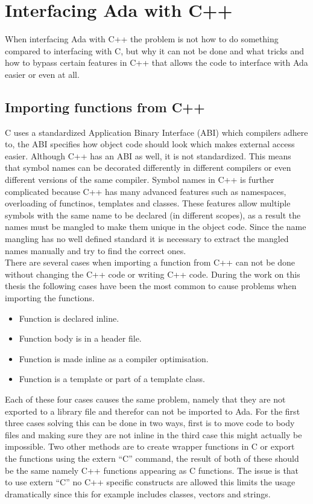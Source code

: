 \chapter{Interfacing Ada with C++}
When interfacing Ada with C++ the problem is not how to do something compared to interfacing with C, but why it can not be done and what tricks and how to bypass certain features in C++ that allows the code to interface with Ada easier or even at all.
\section{Importing functions from C++}
C uses a standardized Application Binary Interface (ABI) which compilers adhere to, the ABI specifies how object code should look which makes external access easier. Although C++ has an ABI as well, it is not standardized. This means that symbol names can be decorated differently in different compilers or even different versions of the same compiler. Symbol names in C++ is further complicated because C++ has many advanced features such as namespaces, overloading of functinos, templates and classes. These features allow multiple symbols with the same name to be declared (in different scopes), as a result the names must be mangled to make them unique in the object code. Since the name mangling has no well defined standard it is necessary to extract the mangled names manually and try to find the correct ones.
\\
There are several cases when importing a function from C++ can not be done without changing the C++ code or writing C++ code. During the work on this thesis the following cases have been the most common to cause problems when importing the functions.
\begin{itemize}
\item Function is declared inline.
\item Function body is in a header file.
\item Function is made inline as a compiler optimisation.
\item Function is a template or part of a template class.
\end{itemize}
Each of these four cases causes the same problem, namely that they are not exported to a library file and therefor can not be imported to Ada. For the first three cases solving this can be done in two ways, first is to move code to body files and making sure they are not inline in the third case this might actually be impossible. Two other methods are to create wrapper functions in C or export the functions using the extern ``C'' command, the result of both of these should be the same namely C++ functions appearing as C functions. The issue is that to use extern ``C'' no C++ specific constructs are allowed this limits the usage dramatically since this for example includes classes, vectors and strings. 

